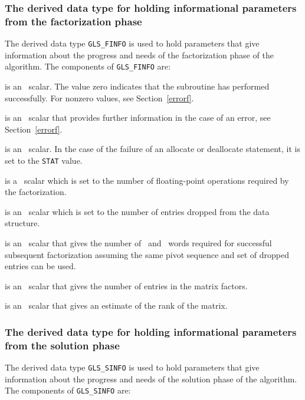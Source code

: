 \documentclass{galahad}
\newcommand{\packagename}{GLS}
\begin{document}

\subsubsection{The derived data type for holding informational
 parameters from the factorization phase}\label{typeinformf}
The derived data type 
{\tt \packagename\_FINFO} 
is used to hold parameters that give information about the progress and needs 
of the factorization phase of the algorithm. The components of
{\tt \packagename\_FINFO} 
are:

\begin{description}

 is an \integer\ scalar. The value
 zero indicates that the subroutine has performed
 successfully.  For nonzero values, see Section~\ref{errorf}.

 is an \integer\ scalar that provides further information in the
case of an error, see Section~\ref{errorf}.

 is an \integer\ scalar. In the case of the failure of an
allocate or deallocate statement, it is set to the {\tt STAT} value.

 is a \realdp\  scalar which is set to the number of
 floating-point operations required by the factorization.

 is an \integer\ scalar which is set to the number of
entries dropped from the data structure.

 is an \integer\ scalar that gives the number
 of \realdp\  and \integer\ words required for successful
 subsequent factorization assuming the same pivot sequence and set of
 dropped entries can be used.

 is an \integer\ scalar that gives the number of 
 entries in the matrix factors.

 is an \integer\ scalar that gives an estimate of the rank of the
matrix.

\end{description}


\subsubsection{The derived data type for holding informational
 parameters from the solution phase}\label{typeinforms}
The derived data type 
{\tt \packagename\_SINFO} 
is used to hold parameters that give information about the progress and needs 
of the solution phase of the algorithm. The components of
{\tt \packagename\_SINFO} 
are:
\end{document}

